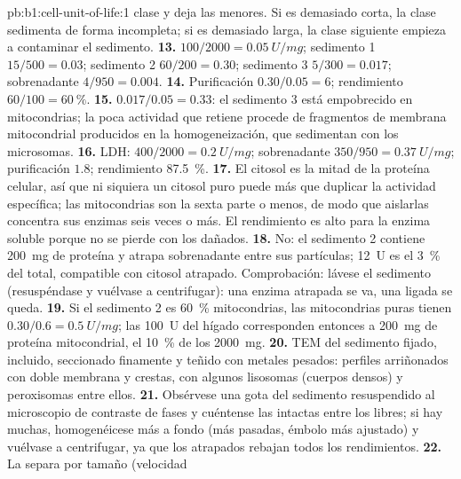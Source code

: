 \begin{solution}{pb:b1:cell-unit-of-life:1}
clase y deja las menores. Si es demasiado corta, la clase sedimenta de forma
incompleta; si es demasiado larga, la clase siguiente empieza a contaminar
el sedimento.
\textbf{13.}  $100/2000 = \qty{0.05}{U/mg}$; sedimento 1
$15/500 = 0.03$; sedimento 2 $60/200 = 0.30$; sedimento 3 $5/300 = 0.017$;
sobrenadante $4/950 = 0.004$.
\textbf{14.} Purificación $0.30/0.05 = 6$; rendimiento $60/100 =
\qty{60}{\%}$.
\textbf{15.} $0.017/0.05 = 0.33$: el sedimento 3 está empobrecido en mitocondrias; la poca actividad que retiene procede de fragmentos de membrana mitocondrial producidos en la homogeneización, que sedimentan con los microsomas.
\textbf{16.} LDH:  $400/2000 = \qty{0.2}{U/mg}$; sobrenadante
$350/950 = \qty{0.37}{U/mg}$; purificación $1.8$; rendimiento \qty{87.5}{\%}.
\textbf{17.} El citosol es la mitad de la proteína celular, así que ni
siquiera un citosol puro puede más que duplicar la actividad específica; las
mitocondrias son la sexta parte o menos, de modo que aislarlas concentra sus
enzimas seis veces o más. El rendimiento es alto para la enzima soluble
porque no se pierde con los  dañados.
\textbf{18.} No: el sedimento 2 contiene \qty{200}{mg} de proteína y atrapa
sobrenadante entre sus partículas; \qty{12}{U} es el \qty{3}{\%} del total,
compatible con citosol atrapado. Comprobación: lávese el sedimento
(resuspéndase y vuélvase a centrifugar): una enzima atrapada se va, una
ligada se queda.
\textbf{19.} Si el sedimento 2 es \qty{60}{\%} mitocondrias, las
mitocondrias puras tienen $0.30/0.6 = \qty{0.5}{U/mg}$; las \qty{100}{U} del
hígado corresponden entonces a \qty{200}{mg} de proteína mitocondrial, el
\qty{10}{\%} de los \qty{2000}{mg}.
\textbf{20.} TEM del sedimento fijado, incluido, seccionado finamente y
teñido con metales pesados: perfiles arriñonados con doble membrana y
crestas, con algunos lisosomas (cuerpos densos) y peroxisomas entre ellos.
\textbf{21.} Obsérvese una gota del sedimento resuspendido al microscopio de contraste de fases y cuéntense las  intactas entre los  libres; si hay muchas, homogenéicese más a fondo (más pasadas, émbolo más ajustado) y vuélvase a centrifugar, ya que los  atrapados rebajan todos los rendimientos.
\textbf{22.} La  separa por tamaño (velocidad

\end{solution}
